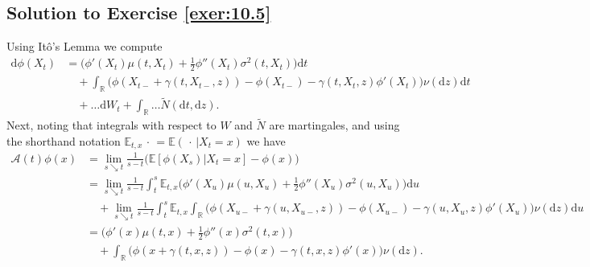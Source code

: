 \documentclass[12pt]{book}
\let\varphi\phi
\numberwithin{equation}{chapter}
\theoremstyle{plain}
\numberwithin{theorem}{section}
\theoremstyle{definition}
\numberwithin{exercise}{chapter}
\newcommand{\<}{\langle}
\renewcommand{\>}{\rangle}
\renewcommand{\(}{\left(}
\renewcommand{\)}{\right)}
\renewcommand{\[}{\left[}
\renewcommand{\]}{\right]}
\newcommand\Eb{\mathds{E}}
\newcommand\Rb{\mathds{R}}
\newcommand\Ac{\mathscr{A}}
\newcommand\sig{\sigma}
\newcommand\gam{\gamma}
\newcommand\Nt{\widetilde{N}}
\newcommand\dd{\mathrm{d}}
\begin{document}
\subsection*{Solution to Exercise \ref{exer:10.5}}
Using It\^o's Lemma we compute
\begin{align}
\dd \varphi(X_t) 
	&=	\Big( \varphi'(X_t) \mu(t,X_t) + \tfrac{1}{2}\varphi''(X_t) \sig^2(t,X_t) \Big) \dd t \\ & \quad
			+ \int_\Rb \Big( \varphi( X_{t-} + \gam(t,X_{t-},z) ) - \varphi(X_{t-}) - \gam(t,X_t,z) \varphi'(X_t) \Big) \nu(\dd z)  \dd t \\ & \quad
			+ \ldots \dd W_t + \int_\Rb \ldots \Nt( \dd t, \dd z) .
\end{align}
Next, noting that integrals with respect to $W$ and $\Nt$ are martingales, and using the shorthand notation $\Eb_{t,x} \, \cdot \, = \Eb( \, \cdot \, | X_t = x)$ we have
\begin{align}
\Ac(t) \varphi(x)
	&=	\lim_{s \searrow t} \frac{1}{s-t} \Big( \Eb[ \varphi(X_s) | X_t = x ] - \varphi(x) \Big) \\
	&=	\lim_{s \searrow t} \frac{1}{s-t} \int_t^s \Eb_{t,x} \Big( \varphi'(X_u) \mu(u,X_u) + \tfrac{1}{2}\varphi''(X_u) \sig^2(u,X_u) \Big) \dd u \\ & \quad
			+ \lim_{s \searrow t} \frac{1}{s-t} \int_t^s \Eb_{t,x} \int_\Rb \Big( \varphi( X_{u-} + \gam(u,X_{u-},z) ) - \varphi(X_{u-}) - \gam(u,X_u,z) \varphi'(X_u) \Big) \nu(\dd z)  \dd u \\
	&=	\Big( \varphi'(x) \mu(t,x) + \tfrac{1}{2}\varphi''(x) \sig^2(t,x) \Big) \\ & \quad
			+ \int_\Rb \Big( \varphi( x + \gam(t,x,z) ) - \varphi(x) - \gam(t,x,z) \varphi'(x) \Big) \nu(\dd z) .
\end{align}
\end{document}
